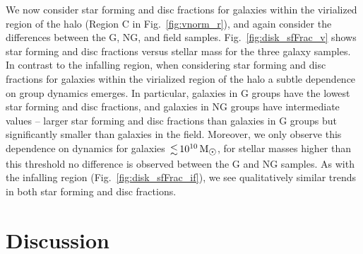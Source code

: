 \documentclass[a4paper,fleqn,usenatbib]{mnras}
\newcommand{\Msun}{\,\mathrm{M_{\sun}}}
\begin{document}
We now consider star forming and disc fractions for galaxies within
the virialized region of the halo (Region C in
Fig.~\ref{fig:vnorm_r}), and again consider the differences between
the G, NG, and field samples.  Fig.~\ref{fig:disk_sfFrac_v} shows star
forming and disc fractions versus stellar mass for the three galaxy
samples.  In contrast to the infalling region, when
considering star forming and
disc fractions for galaxies within the virialized region of the halo a
subtle dependence 
on group dynamics emerges.  In particular, galaxies in G groups have
the lowest star forming and 
disc fractions, and galaxies in NG groups have intermediate
values -- larger star forming and disc fractions than galaxies in G
groups but significantly smaller than galaxies in the field.
Moreover, we only observe this dependence on dynamics for galaxies
$\la 10^{10}\Msun$, for stellar masses higher than this threshold no
difference is observed between the G and NG samples.  As with the
infalling region (Fig.~\ref{fig:disk_sfFrac_if}), we see qualitatively similar trends in both star forming and
disc fractions.


\section{Discussion}
\label{sec:discussion}
\end{document}
